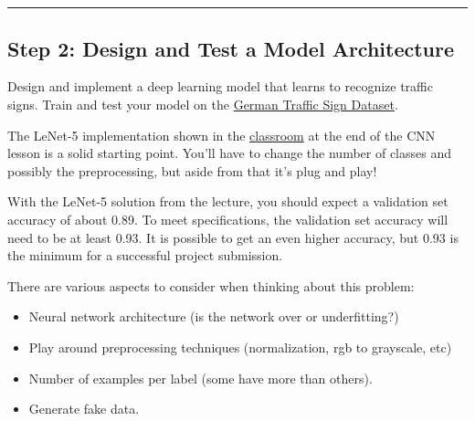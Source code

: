 \documentclass[11pt]{article}
\providecommand{\tightlist}{%
      \setlength{\itemsep}{0pt}\setlength{\parskip}{0pt}}
\begin{document}
    \begin{center}
    \end{center}
    { \hspace*{\fill} \\}
    
    \begin{center}
    \end{center}
    { \hspace*{\fill} \\}
    
    \begin{center}\rule{0.5\linewidth}{\linethickness}\end{center}

\hypertarget{step-2-design-and-test-a-model-architecture}{%
\subsection{Step 2: Design and Test a Model
Architecture}\label{step-2-design-and-test-a-model-architecture}}

Design and implement a deep learning model that learns to recognize
traffic signs. Train and test your model on the
\href{http://benchmark.ini.rub.de/?section=gtsrb\&subsection=dataset}{German
Traffic Sign Dataset}.

The LeNet-5 implementation shown in the
\href{https://classroom.udacity.com/nanodegrees/nd013/parts/fbf77062-5703-404e-b60c-95b78b2f3f9e/modules/6df7ae49-c61c-4bb2-a23e-6527e69209ec/lessons/601ae704-1035-4287-8b11-e2c2716217ad/concepts/d4aca031-508f-4e0b-b493-e7b706120f81}{classroom}
at the end of the CNN lesson is a solid starting point. You'll have to
change the number of classes and possibly the preprocessing, but aside
from that it's plug and play!

With the LeNet-5 solution from the lecture, you should expect a
validation set accuracy of about 0.89. To meet specifications, the
validation set accuracy will need to be at least 0.93. It is possible to
get an even higher accuracy, but 0.93 is the minimum for a successful
project submission.

There are various aspects to consider when thinking about this problem:

\begin{itemize}
\tightlist
\item
  Neural network architecture (is the network over or underfitting?)
\item
  Play around preprocessing techniques (normalization, rgb to grayscale,
  etc)
\item
  Number of examples per label (some have more than others).
\item
  Generate fake data.
\end{itemize}
\end{document}
